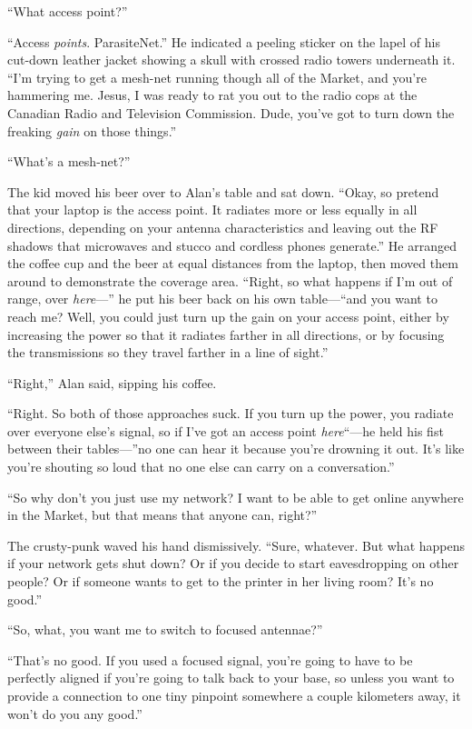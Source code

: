 ``What access point?''

``Access \textit{points}.  ParasiteNet.'' He indicated a peeling
sticker on the lapel of his cut-down leather jacket showing a skull
with crossed radio towers underneath it.  ``I'm trying to get a
mesh-net running though all of the Market, and you're hammering me. 
Jesus, I was ready to rat you out to the radio cops at the Canadian
Radio and Television Commission.  Dude, you've got to turn down the
freaking \textit{gain} on those things.''

``What's a mesh-net?''

The kid moved his beer over to Alan's table and sat down.  ``Okay, so
pretend that your laptop is the access point.  It radiates more or
less equally in all directions, depending on your antenna
characteristics and leaving out the RF shadows that microwaves and
stucco and cordless phones generate.'' He arranged the coffee cup and
the beer at equal distances from the laptop, then moved them around to
demonstrate the coverage area.  ``Right, so what happens if I'm out of
range, over \textit{here}---'' he put his beer back on his own
table---``and you want to reach me?  Well, you could just turn up the
gain on your access point, either by increasing the power so that it
radiates farther in all directions, or by focusing the transmissions
so they travel farther in a line of sight.''

``Right,'' Alan said, sipping his coffee.

``Right.  So both of those approaches suck.  If you turn up the power,
you radiate over everyone else's signal, so if I've got an access
point \textit{here}``---he held his fist between their tables---''no one
can hear it because you're drowning it out.  It's like you're shouting
so loud that no one else can carry on a conversation.''

``So why don't you just use my network?  I want to be able to get
online anywhere in the Market, but that means that anyone can,
right?''

The crusty-punk waved his hand dismissively.  ``Sure, whatever.  But
what happens if your network gets shut down?  Or if you decide to
start eavesdropping on other people?  Or if someone wants to get to
the printer in her living room?  It's no good.''

``So, what, you want me to switch to focused antennae?''

``That's no good.  If you used a focused signal, you're going to have
to be perfectly aligned if you're going to talk back to your base, so
unless you want to provide a connection to one tiny pinpoint somewhere
a couple kilometers away, it won't do you any good.''

